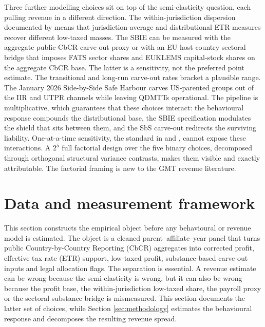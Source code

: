 \documentclass[11pt,a4paper]{article}
\begin{document}
Three further modelling choices sit on top of the semi-elasticity question, each pulling revenue in a different direction. The within-jurisdiction dispersion documented by \citet{hugger2026} means that jurisdiction-average and distributional ETR measures recover different low-taxed masses. The SBIE can be measured with the aggregate public-CbCR carve-out proxy or with an EU host-country sectoral bridge that imposes FATS sector shares and EUKLEMS capital-stock shares on the aggregate CbCR base. The latter is a sensitivity, not the preferred point estimate. The transitional and long-run carve-out rates bracket a plausible range. The January 2026 Side-by-Side Safe Harbour carves US-parented groups out of the IIR and UTPR channels while leaving QDMTTs operational. The pipeline is multiplicative, which guarantees that these choices interact: the behavioural response compounds the distributional base, the SBIE specification modulates the shield that sits between them, and the SbS carve-out redirects the surviving liability. One-at-a-time sensitivity, the standard in \citet{barake2022} and \citet{hugger2026}, cannot expose these interactions. A $2^5$ full factorial design over the five binary choices, decomposed through orthogonal structural variance contrasts, makes them visible and exactly attributable. The factorial framing is new to the GMT revenue literature.

\newpage

\section{Data and measurement framework}\label{data}\label{sec:data}\label{sec:descriptive}

This section constructs the empirical object before any behavioural or revenue model is estimated. The object is a cleaned parent--affiliate--year panel that turns public Country-by-Country Reporting (CbCR) aggregates into corrected profit, effective tax rate (ETR) support, low-taxed profit, substance-based carve-out inputs and legal allocation flags. The separation is essential. A revenue estimate can be wrong because the semi-elasticity is wrong, but it can also be wrong because the profit base, the within-jurisdiction low-taxed share, the payroll proxy or the sectoral substance bridge is mismeasured. This section documents the latter set of choices, while Section \ref{sec:methodology} estimates the behavioural response and decomposes the resulting revenue spread.
\end{document}
